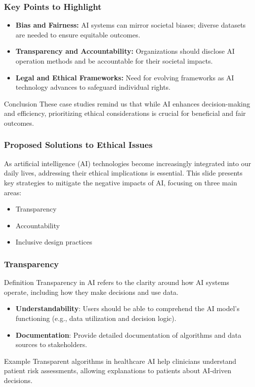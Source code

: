 \documentclass[aspectratio=169]{beamer}
\begin{document}
\begin{frame}[fragile]
    \frametitle{Key Points to Highlight}
    \begin{itemize}
        \item \textbf{Bias and Fairness:} AI systems can mirror societal biases; diverse datasets are needed to ensure equitable outcomes.
        \item \textbf{Transparency and Accountability:} Organizations should disclose AI operation methods and be accountable for their societal impacts.
        \item \textbf{Legal and Ethical Frameworks:} Need for evolving frameworks as AI technology advances to safeguard individual rights.
    \end{itemize}
    \begin{block}{Conclusion}
        These case studies remind us that while AI enhances decision-making and efficiency, prioritizing ethical considerations is crucial for beneficial and fair outcomes.
    \end{block}
\end{frame}

\begin{frame}[fragile]
    \frametitle{Proposed Solutions to Ethical Issues}
    
    As artificial intelligence (AI) technologies become increasingly integrated into our daily lives, addressing their ethical implications is essential. This slide presents key strategies to mitigate the negative impacts of AI, focusing on three main areas: 
    \begin{itemize}
        \item Transparency
        \item Accountability
        \item Inclusive design practices
    \end{itemize}
\end{frame}

\begin{frame}[fragile]
    \frametitle{Transparency}
    
    \begin{block}{Definition}
        Transparency in AI refers to the clarity around how AI systems operate, including how they make decisions and use data.
    \end{block}

    \begin{itemize}
        \item \textbf{Understandability}: Users should be able to comprehend the AI model's functioning (e.g., data utilization and decision logic).
        \item \textbf{Documentation}: Provide detailed documentation of algorithms and data sources to stakeholders.
    \end{itemize}

    \begin{block}{Example}
        Transparent algorithms in healthcare AI help clinicians understand patient risk assessments, allowing explanations to patients about AI-driven decisions.
    \end{block}

\end{frame}
\end{document}
